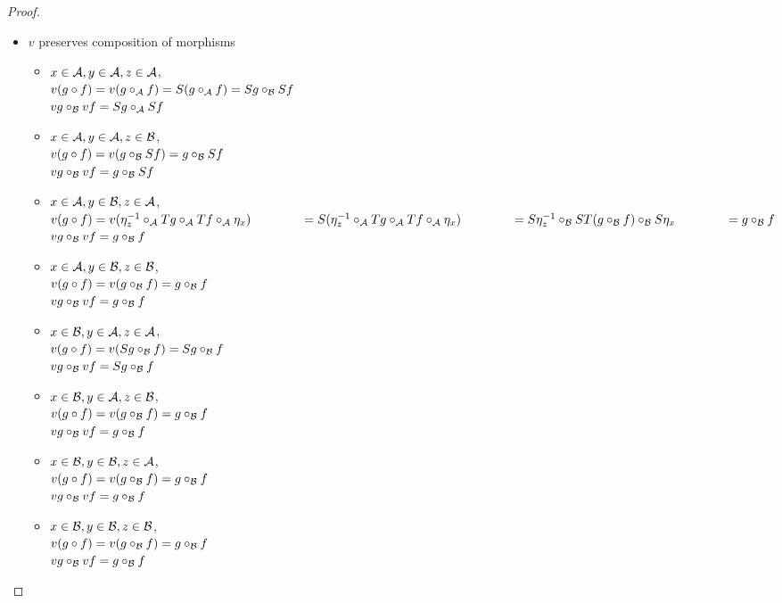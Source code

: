 \documentclass[12pt]{article}
\theoremstyle{plain}
\theoremstyle{definition}
\begin{document}
\begin{proof}
\begin{itemize}
 \item $v$ preserves composition of morphisms
 \begin{itemize}
 \item $x \in {\cal A}, y \in {\cal A}, z \in {\cal A}$, \\
$v(g \circ f) =v(g \circ_{{\cal A}} f)=S(g \circ_{{\cal A}} f) = Sg \circ_{{\cal B}} Sf$ \\
$vg \circ_{{\cal B}} vf =Sg \circ_{{\cal A}} Sf$
 \item $x \in {\cal A}, y \in {\cal A}, z \in {\cal B}$, \\
$v(g \circ f) = v(g \circ_{{\cal B}} Sf) = g \circ_{{\cal B}} Sf$ \\
$vg \circ_{{\cal B}} vf = g \circ_{{\cal B}} Sf$
 \item $ x \in {\cal A}, y \in {\cal B}, z \in {\cal A}$, \\
$v(g \circ f) = v(\eta_{z}^{-1} \circ_{{\cal A}} Tg \circ_{{\cal A}} Tf \circ_{{\cal A}} \eta_{x}) \\
\hspace{40pt} =S(\eta_{z}^{-1} \circ_{{\cal A}} Tg \circ_{{\cal A}} Tf \circ_{{\cal A}} \eta_{x}) \\
\hspace{40pt} = S\eta_{z}^{-1} \circ_{{\cal B}} ST(g \circ_{{\cal B}} f) \circ_{{\cal B}} S\eta_{x} \\
\hspace{40pt} = g \circ_{{\cal B}} f $ \\
$vg \circ_{{\cal B}} vf = g \circ_{{\cal B}} f$
\item $ x \in {\cal A}, y \in {\cal B}, z \in {\cal B}$, \\
$v(g \circ f) = v(g \circ_{{\cal B}} f) = g \circ_{{\cal B}} f$ \\
$vg \circ_{{\cal B}} vf = g \circ_{{\cal B}} f$
\item $x \in {\cal B}, y \in {\cal A}, z \in {\cal A}$, \\
$v(g \circ f) = v(Sg \circ_{{\cal B}} f) = Sg \circ_{{\cal B}} f$ \\
$vg \circ_{{\cal B}} vf = Sg \circ_{{\cal B}} f$
\item $x \in {\cal B}, y \in {\cal A}, z \in {\cal B}$, \\
$v(g \circ f) = v(g \circ_{{\cal B}} f) = g \circ_{{\cal B}} f$ \\
$vg \circ_{{\cal B}} vf = g \circ_{{\cal B}} f$
\item $x \in {\cal B}, y \in {\cal B}, z \in {\cal A}$, \\
$v(g \circ f) = v(g \circ_{{\cal B}} f) = g \circ_{{\cal B}} f$ \\
$vg \circ_{{\cal B}} vf = g \circ_{{\cal B}} f$ 
\item $ x \in {\cal B}, y \in {\cal B}, z \in {\cal B}$, \\
$v(g \circ f) = v(g \circ_{{\cal B}} f) = g \circ_{{\cal B}} f$ \\
$vg \circ_{{\cal B}} vf = g \circ_{{\cal B}} f$
 \end{itemize}
 

\end{itemize}
\end{proof}
\end{document}
